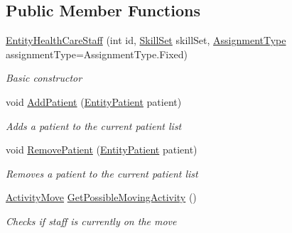 \subsection*{Public Member Functions}
\begin{DoxyCompactItemize}
\item 
\hyperlink{class_general_health_care_elements_1_1_entities_1_1_entity_health_care_staff_acdf5f2d222e5d01184866b2544b1024c}{Entity\+Health\+Care\+Staff} (int id, \hyperlink{class_simulation_core_1_1_h_c_c_m_elements_1_1_skill_set}{Skill\+Set} skill\+Set, \hyperlink{namespace_enums_ac8e46c12834f4cb6a641854bd0676221}{Assignment\+Type} assignment\+Type=Assignment\+Type.\+Fixed)
\begin{DoxyCompactList}\small\item\em Basic constructor \end{DoxyCompactList}\item 
void \hyperlink{class_general_health_care_elements_1_1_entities_1_1_entity_health_care_staff_abe4afb8f1a087f4b03d7bd89284c9722}{Add\+Patient} (\hyperlink{class_general_health_care_elements_1_1_entities_1_1_entity_patient}{Entity\+Patient} patient)
\begin{DoxyCompactList}\small\item\em Adds a patient to the current patient list \end{DoxyCompactList}\item 
void \hyperlink{class_general_health_care_elements_1_1_entities_1_1_entity_health_care_staff_a2b2b7e7fa07128e12fe857ea1d1ab614}{Remove\+Patient} (\hyperlink{class_general_health_care_elements_1_1_entities_1_1_entity_patient}{Entity\+Patient} patient)
\begin{DoxyCompactList}\small\item\em Removes a patient to the current patient list \end{DoxyCompactList}\item 
\hyperlink{class_general_health_care_elements_1_1_activities_1_1_activity_move}{Activity\+Move} \hyperlink{class_general_health_care_elements_1_1_entities_1_1_entity_health_care_staff_adb24ca1827be949204b9c43d71b1ffbb}{Get\+Possible\+Moving\+Activity} ()
\begin{DoxyCompactList}\small\item\em Checks if staff is currently on the move \end{DoxyCompactList}\end{DoxyCompactItemize}
